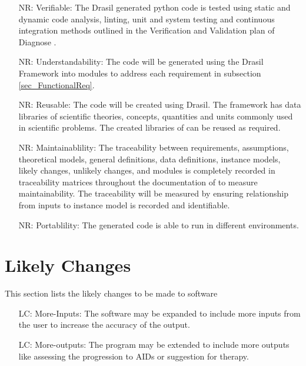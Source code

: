 \documentclass[12pt]{article}
\newcounter{reqnum} %
\newcounter{nreqnum} %
\newcounter{lcnum} %
\begin{document}
\noindent \begin{itemize}

\item[NR\refstepcounter{nreqnum}\thenreqnum \label{NR_Verifiable}:] 
Verifiable: The Drasil generated python code is tested using static and dynamic 
code analysis, linting, unit and system testing and continuous integration 
methods outlined in the Verification and Validation plan of Diagnose 
\citep{DiagnoseVNVplan}.


\item[NR\refstepcounter{nreqnum}\thenreqnum \label{NR_Understandability}:] 
Understandability: The code will be generated using the Drasil Framework into 
modules to address each requirement in subsection \ref{sec_FunctionalReq}.

\item[NR\refstepcounter{nreqnum}\thenreqnum \label{NR_Reusable}:] 
Reusable: The code will be created using Drasil. The framework has data 
libraries of scientific theories, concepts, quantities and units commonly used 
in scientific problems. The created libraries of \progname{} can be reused as 
required. \citep{Drasilcreate}

\item[NR\refstepcounter{nreqnum}\thenreqnum \label{NR_Maintainability}:] 
Maintainablility: The traceability between requirements, assumptions, 
theoretical models, general 
definitions, data definitions, instance models, likely changes, unlikely 
changes, and modules is completely recorded in traceability matrices throughout the documentation of  \progname{} to measure maintainability. The traceability will be measured by 
ensuring relationship from inputs to instance model is recorded and 
identifiable. 

\item[NR\refstepcounter{nreqnum}\thenreqnum \label{NR_Portablility}:] 
Portablility: The generated code is able to run in different environments. 


\end{itemize}


\section{Likely Changes} 

This section lists the likely changes to be made to software   

\noindent \begin{itemize}

\item[LC\refstepcounter{lcnum}\thelcnum\label{LC_more_inputs}:] More-Inputs: The 
software may be expanded to include more inputs from the user to increase the 
accuracy of the output.

\item[LC\refstepcounter{lcnum}\thelcnum\label{LC_more_outputs}:] 
More-outputs: The program may be extended to include more outputs like assessing 
the progression to AIDs or suggestion for therapy.
\end{itemize}
\end{document}
